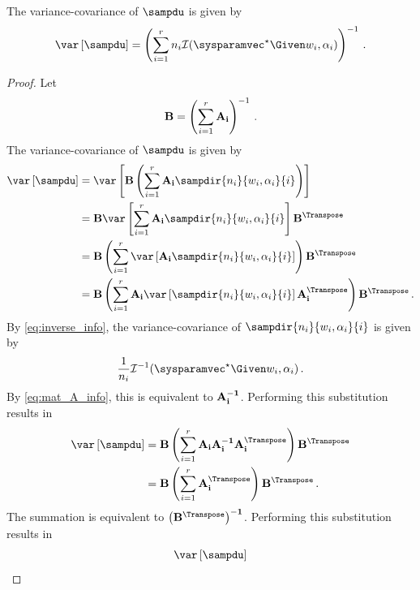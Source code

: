 \documentclass[ ../main.tex]{subfiles}
\begin{document}
\begin{theorem}
\label{thm:var_sampdu}
The variance-covariance of $\sampdu$ is given by
\begin{equation}
\label{eq:var_samp_d_full}
    \var\left[\sampdu\right] = \left( \sum_{i=1}^{r} n_i \infomatrx(\tparam\sysparamvec \Given w_i, \alpha_i) \right)^{-1}\,.
\end{equation}
\end{theorem}
\begin{proof}
Let
\begin{equation}
\label{eq:proof_of_var_samp_d_full_mat_B}
    \mathbf{B} = \left( \sum_{i=1}^{r} \mathbf{A_i} \right)^{-1}\,.
\end{equation}
The variance-covariance of $\sampdu$ is given by
\begin{align}
    \var\left[\sampdu\right]
        &= \var\left[\matrx{B} \left( \sum_{i=1}^{r} \matrx{A_i} \sampdir{n_i}{w_i,\alpha_i}{i} \right)\right]\\
        &= \matrx{B} \var\left[\sum_{i=1}^{r} \matrx{A_i} \sampdir{n_i}{w_i,\alpha_i}{i} 
        \right] \matrx{B^{\Transpose}}\\
        &= \matrx{B} \left(\sum_{i=1}^{r} \var\left[\matrx{A_i} 
        \sampdir{n_i}{w_i,\alpha_i}{i} \right]\right) \matrx{B^{\Transpose}}\\
        &= \matrx{B} \left(\sum_{i=1}^{r} \matrx{A_i} \var\left[ 
        \sampdir{n_i}{w_i,\alpha_i}{i} \right] \matrx{A_i^{\Transpose}} \right) 
        \matrx{B^{\Transpose}}\,.
\end{align}
By \cref{eq:inverse_info}, the variance-covariance of $\sampdir{n_i}{w_i,\alpha_i}{i}$ is given by
\begin{equation}
    \frac{1}{n_i} \infomatrx^{-1}(\tparam\sysparamvec \Given w_i, \alpha_i)\,.
\end{equation}
By \cref{eq:mat_A_info}, this is equivalent to $\mathbf{A_i^{-1}}$. Performing this substitution results in
\begin{align}
    \var\left[\sampdu\right]
        &= \matrx{B} \left(\sum_{i=1}^{r} \matrx{A_i} \matrx{A_i^{-1}} 
        \matrx{A_i^{\Transpose}} \right) \matrx{B^{\Transpose}}\\
        &= \matrx{B} \left(\sum_{i=1}^{r} \matrx{A_i^{\Transpose}}\right) 
        \matrx{B^{\Transpose}}\,.
\end{align}
The summation is equivalent to $\matrx{\left({B^{\Transpose}}\right)^{-1}}$. 
Performing this substitution results in
\begin{align}
    \var\left[\sampdu\right]

\end{align}
\end{proof}
\end{document}

